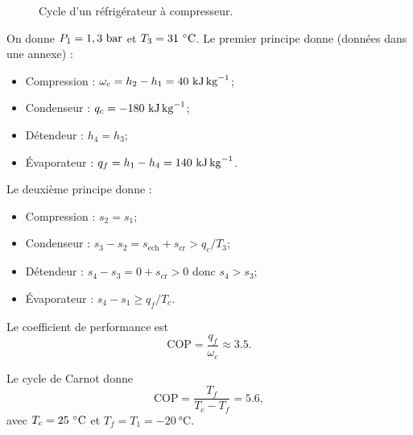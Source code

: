 \begin{figure}
            \caption{Cycle d'un réfrigérateur à compresseur.}    
            \label{fig:cycle_refrigerateur_a_compresseur}
        \end{figure}
        
        On donne $P_1=1,3~\si[]{\bar}$ et $T_3=31~\si[]{\celsius}$. Le premier principe donne (données dans une annexe) :
        \begin{itemize}
            \item Compression : $\omega_c=h_2-h_1=40~\si[]{\kilo\joule\per\kilogram}$;
            \item Condenseur : $q_c=-180~\si[]{\kilo\joule\per\kilogram}$;
            \item Détendeur : $h_4=h_3$;
            \item Évaporateur : $q_f=h_1-h_4=140~\si[]{\kilo\joule\per\kilogram}$.
        \end{itemize}

        Le deuxième principe donne :
        \begin{itemize}
            \item Compression : $s_2=s_1$;
            \item Condenseur : $s_3-s_2=s_{\text{ech}}+s_{\text{cr}}>q_c/T_3$;
            \item Détendeur : $s_4-s_3=0+s_{\text{cr}}>0$ donc $s_4>s_3$;
            \item Évaporateur : $s_4-s_1\geqslant q_f/T_c$.
        \end{itemize}

        Le coefficient de performance est 
        \begin{equation*}
            \text{COP}=\frac{q_f}{\omega_c}\approx3.5.
        \end{equation*}

        Le cycle de Carnot donne 
        \begin{equation*}
            \text{COP}=\frac{T_f}{T_c-T_f}=5.6,
        \end{equation*}
        avec $T_c=25~\si[]{\celsius}$ et $T_f=T_1=-20~\si{\celsius}$.